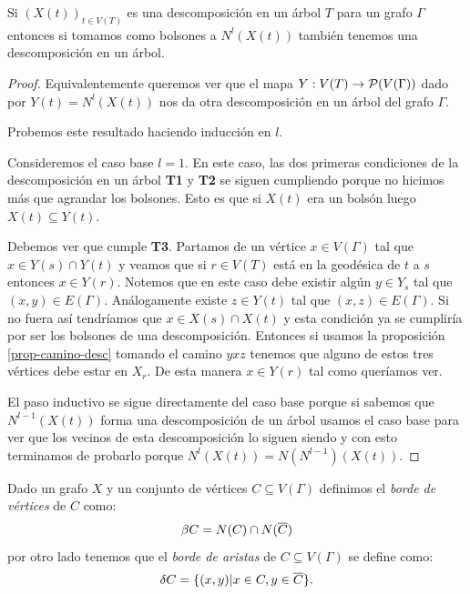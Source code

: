 \documentclass[tesis.tex]{subfiles}
\begin{document}
\begin{prop}\label{prop-vecinos-desc}
	Si $(X(t))_{t \in V(T)}$ es una descomposición en un árbol $T$ para un grafo $\Gamma$ entonces si tomamos como bolsones a $N^l(X(t))$ también tenemos una descomposición en un árbol.
\end{prop}
\begin{proof}
	Equivalentemente queremos ver que el mapa $Y: V(T) \to {\cal P}(V(\Gamma))$ dado por $Y(t) = N^l(X(t))$ nos da otra descomposición en un árbol del grafo $\Gamma$.
	
	Probemos este resultado haciendo inducción en $l$.
	
	Consideremos el caso base $l=1$.
	En este caso, las dos primeras condiciones de la descomposición en un árbol \textbf{T1} y \textbf{T2} se siguen cumpliendo porque no hicimos más que agrandar los bolsones. 
	Esto es que si $X(t)$ era un bolsón luego $X(t) \subseteq Y(t)$.
	
	Debemos ver que cumple \textbf{T3}.
	Partamos de un vértice $x \in V(\Gamma)$ tal que $x \in Y(s) \cap Y(t)$ y veamos que si $r \in V(T)$ está en la geodésica de $t$ a $s$ entonces $x \in Y(r)$.
	Notemos que en este caso debe existir algún $y \in Y_s$ tal que $(x,y) \in E(\Gamma)$.
	Análogamente existe $z \in Y(t)$ tal que $(x,z) \in E(\Gamma)$.
	Si no fuera así tendríamos que $x \in X(s) \cap X(t)$ y esta condición ya se cumpliría por ser los bolsones de una descomposición.
	Entonces si usamos la proposición \ref{prop-camino-desc} tomando el camino $yxz$ tenemos que alguno de estos tres vértices debe estar en $X_r$.
	De esta manera $x \in Y(r)$ tal como queríamos ver.
	
	El paso inductivo se sigue directamente del caso base porque si sabemos que $N^{l-1}(X(t))$ forma una descomposición de un árbol usamos el caso base para ver que los vecinos de esta descomposición lo siguen siendo y con esto terminamos de probarlo porque $N^l(X(t)) = N (N^{l-1})(X(t))$.
\end{proof}
\medskip

\begin{deff}
	Dado un grafo $X$ y un conjunto de vértices $C \subseteq V(\Gamma)$ definimos el \emph{borde de vértices} de $C$ como:
	\[
	\beta C =  N(C) \cap N(\overline{ C})
	\] 
	por otro lado tenemos que el \emph{borde de aristas} de $C \subseteq V(\Gamma)$ se define como:	
	\[
	\delta C = \{  (x,y) | x \in C, y \in \overline C    \}.
	\]
\end{deff}


\begin{center}
\end{center}
\end{document}
